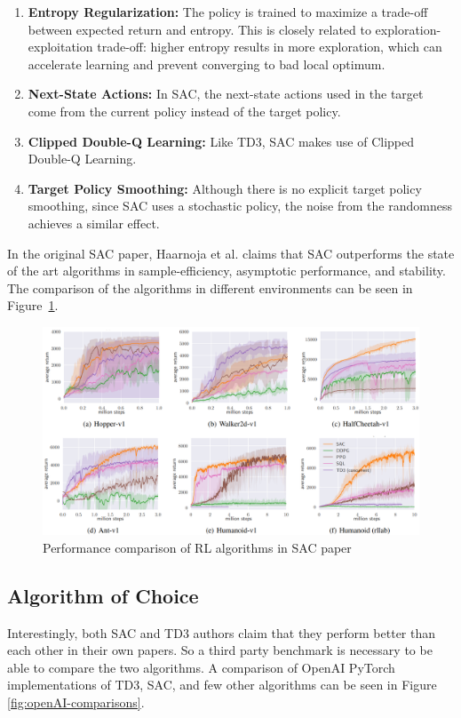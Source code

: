 \documentclass[12pt,twoside]{report}
\begin{document}
\begin{enumerate}
  \item \textbf{Entropy Regularization:} The policy is trained to maximize a trade-off between expected return and entropy. This is closely related to exploration-exploitation trade-off: higher entropy results in more exploration, which can accelerate learning and prevent converging to bad local optimum.
  \item \textbf{Next-State Actions:} In SAC, the next-state actions used in the target come from the current policy instead of the target policy.
  \item \textbf{Clipped Double-Q Learning:} Like TD3, SAC makes use of Clipped Double-Q Learning.
  \item \textbf{Target Policy Smoothing:} Although there is no explicit target policy smoothing, since SAC uses a stochastic policy, the noise from the randomness achieves a similar effect.
\end{enumerate}

In the original SAC paper, Haarnoja et al. claims that SAC outperforms the state of the art algorithms in sample-efficiency, asymptotic performance, and stability. \cite{sacOG} The comparison of the algorithms in different environments can be seen in Figure~\ref{fig:sac-comparisons}.

\begin{figure}[h]
\centering
\includegraphics[width = \hsize]{figures/sac comparison og.png}
\caption{Performance comparison of RL algorithms in SAC paper \cite{sacOG}}
\label{fig:sac-comparisons}
\end{figure}

\subsection{Algorithm of Choice}
Interestingly, both SAC and TD3 authors claim that they perform better than each other in their own papers. So a third party benchmark is necessary to be able to compare the two algorithms. A comparison of OpenAI PyTorch implementations of TD3, SAC, and few other algorithms can be seen in Figure \ref{fig:openAI-comparisons}.
\end{document}
